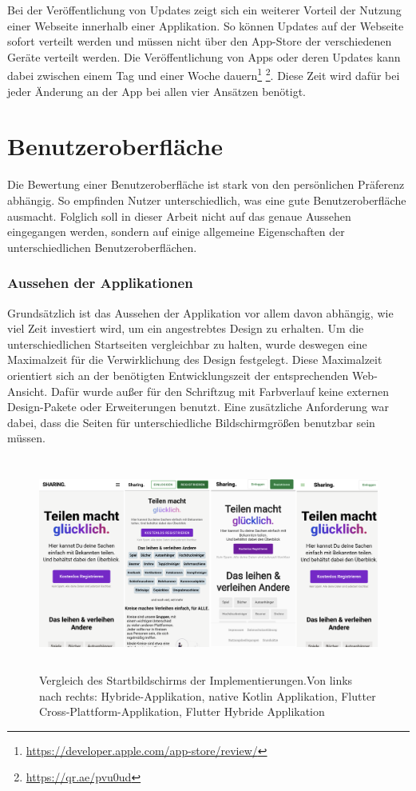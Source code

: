 Bei der Veröffentlichung von Updates zeigt sich ein weiterer Vorteil der Nutzung einer Webseite innerhalb einer Applikation. So können Updates auf der Webseite sofort verteilt werden und müssen nicht über den App-Store der verschiedenen Geräte verteilt werden. Die Veröffentlichung von Apps oder deren Updates kann dabei zwischen einem Tag und einer Woche dauern\footnote{\url{https://developer.apple.com/app-store/review/}} \footnote{\url{https://qr.ae/pvu0ud}}. Diese Zeit wird dafür bei jeder Änderung an der App bei allen vier Ansätzen benötigt.

\section{Benutzeroberfläche}
Die Bewertung einer Benutzeroberfläche ist stark von den persönlichen Präferenz abhängig. So empfinden Nutzer unterschiedlich, was eine gute Benutzeroberfläche ausmacht. Folglich soll in dieser Arbeit nicht auf das genaue Aussehen eingegangen werden, sondern auf einige allgemeine Eigenschaften der unterschiedlichen Benutzeroberflächen.

\subsubsection{Aussehen der Applikationen}
Grundsätzlich ist das Aussehen der Applikation vor allem davon abhängig, wie viel Zeit investiert wird, um ein angestrebtes Design zu erhalten. Um die unterschiedlichen Startseiten vergleichbar zu halten, wurde deswegen eine Maximalzeit für die Verwirklichung des Design festgelegt. Diese Maximalzeit orientiert sich an der benötigten Entwicklungszeit der entsprechenden Web-Ansicht. Dafür wurde außer für den Schriftzug mit Farbverlauf keine externen Design-Pakete oder Erweiterungen benutzt. Eine zusätzliche Anforderung war dabei, dass die Seiten für unterschiedliche Bildschirmgrößen benutzbar sein müssen.

\begin{figure}[ht]
  \centering
  \includegraphics[height=7cm,keepaspectratio]{images/Startbildschirm_vergleich.png} 
  \caption[Vergleich des Startbildschirms der Implementierungen]{Vergleich des Startbildschirms der Implementierungen.\break Von links nach rechts: Hybride-Applikation, native Kotlin Applikation, Flutter Cross-Plattform-Applikation, Flutter Hybride Applikation}
  \label{fig:startscreen}
\end{figure}

